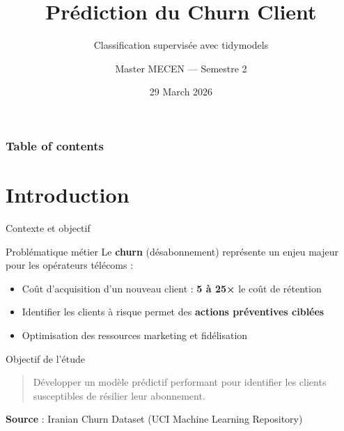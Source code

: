 \documentclass[
  10pt,
  ignorenonframetext,
  aspectratio=169,
]{beamer}
\title{Prédiction du Churn Client}
\subtitle{Classification supervisée avec tidymodels}
\author{Master MECEN --- Semestre 2}
\date{29 March 2026}
\providecommand{\tightlist}{%
  \setlength{\itemsep}{0pt}\setlength{\parskip}{0pt}}\usepackage{longtable,booktabs,array}
\renewcommand*\contentsname{Table of contents}
\newcommand\contentsname{Table of contents}
\begin{document}
\frame{\titlepage}

\renewcommand*\contentsname{Table of contents}
\begin{frame}[allowframebreaks]
  \frametitle{Table of contents}
  \tableofcontents[hideallsubsections]
\end{frame}
\section{Introduction}\label{introduction}

\begin{frame}{Contexte et objectif}
\label{contexte-et-objectif}
\begin{block}{Problématique métier}
\label{probluxe9matique-muxe9tier}
Le \textbf{churn} (désabonnement) représente un enjeu majeur pour les
opérateurs télécoms :

\begin{itemize}
\tightlist
\item
  Coût d'acquisition d'un nouveau client : \textbf{5 à 25×} le coût de
  rétention
\item
  Identifier les clients à risque permet des \textbf{actions préventives
  ciblées}
\item
  Optimisation des ressources marketing et fidélisation
\end{itemize}
\end{block}

\begin{block}{Objectif de l'étude}
\label{objectif-de-luxe9tude}
\begin{quote}
Développer un modèle prédictif performant pour identifier les clients
susceptibles de résilier leur abonnement.
\end{quote}

\textbf{Source} : Iranian Churn Dataset (UCI Machine Learning
Repository)
\end{block}
\end{frame}
\end{document}
